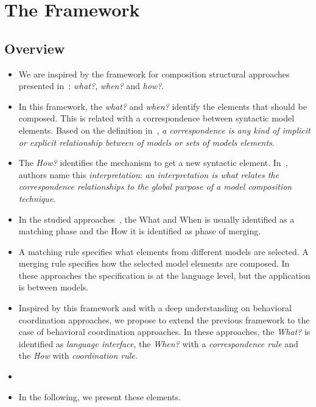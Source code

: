 \section{The Framework}
\subsection{Overview}
\begin{itemize}
	\item We are inspired by the framework for composition structural approaches presented in~\cite{framecompoas,kompose}: \emph{what?}, \emph{when?} and \emph{how?}.
	
	\item In this framework, the \emph{what?} and \emph{when?} identify the elements that should be composed. This is related with a correspondence between syntactic model elements. Based on the definition in~\cite{clavreulmodelcompo}, \emph{a correspondence is any kind of implicit or explicit relationship between of models or sets of models elements}. 
	
	\item The \emph{How?} identifies the mechanism to get a new syntactic element. In~\cite{clavreulmodelcompo}, authors name this \emph{interpretation}: \emph{an interpretation is what relates the correspondence relationships to the global purpose of a model composition technique}.
	   
	\item In the studied approaches~\cite{epsilon,kompose}, the What and When is usually identified as a matching phase and the How it is identified as phase of merging. 

	\item A matching rule specifies what elements from different models are selected. A merging rule specifies how the selected model elements are composed. In these approaches the specification is at the language level, but the application is between models.
	
	\item Inspired by this framework and with a deep understanding on behavioral coordination approaches, we propose to extend the previous framework to the case of behavioral coordination approaches. In these approaches, the \emph{What?} is identified as \emph{language interface}, the \emph{When?} with a \emph{correspondence rule} and the \emph{How} with \emph{coordination rule}. 
	 
	 
	\item {}
	\item In the following, we present these elements.   
	 

\end{itemize}
